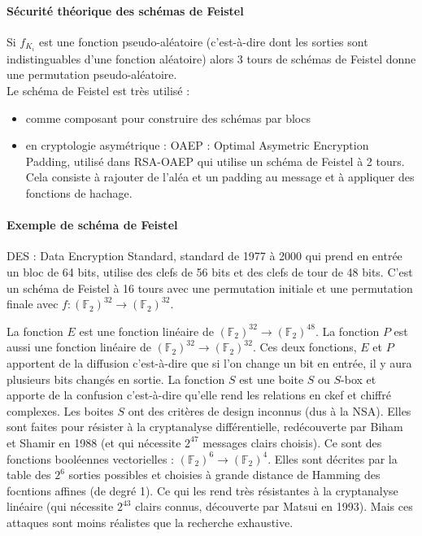 \documentclass[12pt,a4paper]{report}
\begin{document}
\paragraph{Sécurité théorique des schémas de Feistel\\}
Si $f_{K_i}$ est une fonction pseudo-aléatoire (c'est-à-dire dont les sorties sont indistinguables d'une fonction aléatoire) alors 3 tours de schémas de Feistel donne une permutation pseudo-aléatoire.\\
Le schéma de Feistel est très utilisé :
\begin{itemize}
\item comme composant pour construire des schémas par blocs
\item en cryptologie asymétrique : OAEP : Optimal Asymetric Encryption Padding, utilisé dans RSA-OAEP qui utilise un schéma de Feistel à 2 tours. Cela consiste à rajouter de l'aléa et un padding au message et à appliquer des fonctions de hachage.
\end{itemize}
\paragraph{Exemple de schéma de Feistel \\}
DES : Data Encryption Standard, standard de 1977 à 2000 qui prend en entrée un bloc de 64 bits, utilise des clefs de 56 bits et des clefs de tour de 48 bits. C'est un schéma de Feistel à 16 tours avec une permutation initiale et une permutation finale avec $f : (\mathbb{F}_2)^{32} \rightarrow (\mathbb{F}_2)^{32}$.
\begin{center}
  \scalebox{0.6}{}	
\end{center}

La fonction $E$ est une fonction linéaire de $(\mathbb{F}_2)^{32} \rightarrow (\mathbb{F}_2)^{48} $. La fonction $P$ est aussi une fonction linéaire de $(\mathbb{F}_2)^{32} \rightarrow (\mathbb{F}_2)^{32}$. Ces deux fonctions, $E$ et $P$ apportent de la diffusion c'est-à-dire que si l'on change un bit en entrée, il y aura plusieurs bits changés en sortie. La fonction $S$ est une boite $S$ ou $S$-box et apporte de la confusion c'est-à-dire qu'elle rend les relations en ckef et chiffré complexes. Les boites $S$ ont des critères de design inconnus (dus à la NSA). Elles sont faites pour résister à la cryptanalyse différentielle, redécouverte par Biham et Shamir en 1988 (et qui nécessite $2^{47}$ messages clairs choisis). Ce sont des fonctions booléennes vectorielles : $(\mathbb{F}_2)^6 \rightarrow(\mathbb{F}_2)^4 $. Elles sont décrites par la table des $2^6$ sorties possibles et choisies à grande distance de Hamming des focntions affines (de degré 1). Ce qui les rend très résistantes à la cryptanalyse linéaire (qui nécessite $2^{43}$ clairs connus, découverte par Matsui en 1993). Mais ces attaques sont moins réalistes que la recherche exhaustive.
\end{document}
